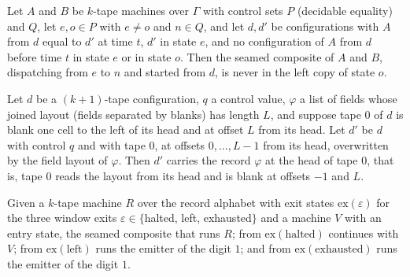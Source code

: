 \begin{lemma}
\label{Complexity.sph_seam_avoids}
\leanok
{}
Let $A$ and $B$ be $k$-tape machines over $\Gamma$ with control sets $P$ (decidable equality) and
$Q$, let $e,o\in P$ with $e\ne o$ and $n\in Q$, and let $d,d'$ be configurations with $A$ from $d$
equal to $d'$ at time $t$, $d'$ in state $e$, and no configuration of $A$ from $d$ before time $t$
in state $e$ or in state $o$. Then the seamed composite of $A$ and $B$, dispatching from $e$ to $n$
and started from $d$, is never in the left copy of state $o$.
\end{lemma}

\begin{lemma}
\label{Complexity.sph_written_record}
\leanok
{}
Let $d$ be a $(k+1)$-tape configuration, $q$ a control value, $\varphi$ a list of fields whose
joined layout (fields separated by blanks) has length $L$, and suppose tape $0$ of $d$ is blank
one cell to the left of its head and at offset $L$ from its head. Let $d'$ be $d$ with control $q$
and with tape $0$, at offsets $0,\dots,L-1$ from its head, overwritten by the field layout of
$\varphi$. Then $d'$ carries the record $\varphi$ at the head of tape $0$, that is, tape $0$ reads
the layout from its head and is blank at offsets $-1$ and $L$.
\end{lemma}

\begin{definition}
\label{Complexity.sphRunnerTailTM}
\leanok
{}
Given a $k$-tape machine $R$ over the record alphabet with exit states $\mathrm{ex}(\varepsilon)$
for the three window exits $\varepsilon\in\{$halted, left, exhausted$\}$ and a machine $V$ with an
entry state, the seamed composite that runs $R$; from $\mathrm{ex}(\text{halted})$ continues with
$V$; from $\mathrm{ex}(\text{left})$ runs the emitter of the digit $1$; and from
$\mathrm{ex}(\text{exhausted})$ runs the emitter of the digit $1$.
\end{definition}

